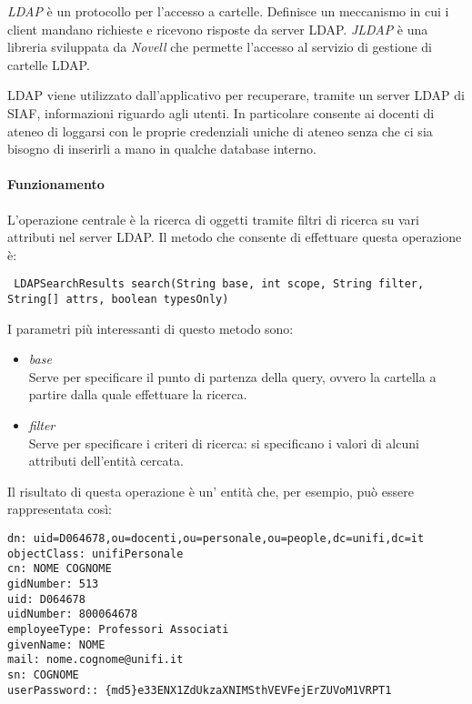 \textsl{LDAP} è un protocollo per l'accesso a cartelle. Definisce un meccanismo in cui i client mandano richieste e ricevono risposte da server LDAP.
\textsl{JLDAP} è una libreria sviluppata da \textsl{Novell} che permette l'accesso al servizio di gestione di cartelle LDAP.

LDAP viene utilizzato dall'applicativo per recuperare, tramite un server LDAP di SIAF, informazioni riguardo agli utenti. In particolare consente ai docenti di ateneo di loggarsi con le proprie credenziali uniche di ateneo 
senza che ci sia bisogno di inserirli a mano in qualche database interno.

\paragraph{Funzionamento}
L'operazione centrale è la ricerca di oggetti tramite filtri di ricerca su vari attributi nel server LDAP. Il metodo che consente di effettuare questa operazione è:

\begin{lstlisting}
 LDAPSearchResults search(String base, int scope, String filter, String[] attrs, boolean typesOnly) 
\end{lstlisting}

I parametri più interessanti di questo metodo sono:
\begin{itemize}
 \item \textsl{base}\\
  Serve per specificare il punto di partenza della query, ovvero la cartella a partire dalla quale effettuare la ricerca. 
  \item \textsl{filter}\\
  Serve per specificare i criteri di ricerca: si specificano i valori di alcuni attributi dell'entità cercata.
\end{itemize}

Il risultato di questa operazione è un' entità che, per esempio, può essere rappresentata così:

\begin{lstlisting}
dn: uid=D064678,ou=docenti,ou=personale,ou=people,dc=unifi,dc=it
objectClass: unifiPersonale
cn: NOME COGNOME
gidNumber: 513
uid: D064678
uidNumber: 800064678
employeeType: Professori Associati
givenName: NOME
mail: nome.cognome@unifi.it
sn: COGNOME
userPassword:: {md5}e33ENX1ZdUkzaXNIMSthVEVFejErZUVoM1VRPT1
\end{lstlisting}

